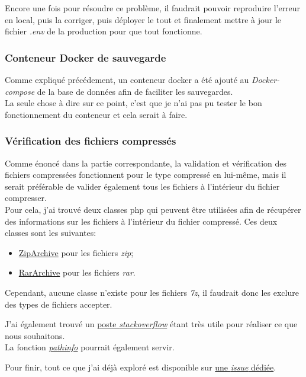 \documentclass[
    iai, %
    il, %
]{heig-tb}
\begin{document}
Encore une fois pour résoudre ce problème, il faudrait pouvoir reproduire l'erreur en local, puis la corriger, puis déployer le tout et finalement mettre à jour le fichier \emph{.env} de la production pour que tout fonctionne.

\subsubsection{Conteneur Docker de sauvegarde}
Comme expliqué précédement, un \Gls{conteneur} \Gls{docker} a été ajouté au \emph{Docker-compose} de la base de données afin de faciliter les sauvegardes.\\
La seule chose à dire sur ce point, c'est que je n'ai pas pu tester le bon fonctionnement du \Gls{conteneur} et cela serait à faire.

\subsubsection{Vérification des fichiers compressés}
Comme énoncé dans la partie correspondante, la validation et vérification des fichiers compressées fonctionnent pour le type compressé en lui-même, mais il serait préférable de valider également tous les fichiers à l'intérieur du fichier compresser. \\
Pour cela, j'ai trouvé deux classes \Gls{php} qui peuvent être utilisées afin de récupérer des informations sur les fichiers à l'intérieur du fichier compressé. Ces deux classes sont les suivantes:
\begin{itemize}
    \item \href{https://www.php.net/manual/fr/class.ziparchive.php}{ZipArchive} pour les fichiers \emph{zip};
    \item \href{https://www.php.net/manual/en/class.rararchive.php}{RarArchive} pour les fichiers \emph{rar}.
\end{itemize}

Cependant, aucune classe n'existe pour les fichiers \emph{7z}, il faudrait donc les exclure des types de fichiers accepter.

J'ai également trouvé un \href{https://stackoverflow.com/questions/25847374/ziparchive-check-file-extension}{poste \emph{stackoverflow}} étant très utile pour réaliser ce que nous souhaitons. \\
La fonction \href{https://www.php.net/manual/fr/function.pathinfo.php}{\emph{pathinfo}} pourrait également servir.

Pour finir, tout ce que j'ai déjà exploré est disponible sur \href{https://github.com/heig-fablab/fablab-manager/issues/139}{une \emph{issue} dédiée}.
\end{document}
